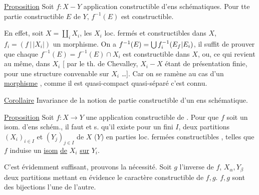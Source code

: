 \uline{Proposition} Soit $f:X-Y$  application constructible d'ens schématiques. Pour tte partie constructible $E$ de $Y$, $f^{-1}(E)$ est constructible.


En effet, soit $X=\coprod_iX_i$, les $X_i$ loc. fermés et constructibles dans $X$,  $f_i=(f\,|\,|X_i|)$ un morphisme. On a $f^{-1}(E)=\bigcup f_i^{-1}(E_f|E_i)$, il suffit de prouver que chaque $f^{-1}(E)=f^{-1}(E)\cap X_i$ est constructible dans $X$, ou, ce qui revient au même, dans $X_i$ [ par le th. de Chevalley,  $X_i-X$ étant de présentation finie, pour une structure  convenable sur $X_i$ \ldots]. Car on se ramène au cas d'un \uline{morphisme} , comme il est quasi-compact quasi-séparé c'est connu.


\uline{Corollaire} Invariance de la notion de partie constructible d'un ens schématique.

\uline{Proposition} Soit $f:X\longrightarrow Y$ une application constructible de  . Pour que $f$ soit un isom. d'ens schém., il faut et s. qu'il existe  pour un fini $I$, deux partitions $(X_i)_{i\in I}$ et $(Y_j)_{j\in I}$ de $X$ ($Y$) en parties loc. fermées constructibles , telles que $f$ induise un \uline{isom} \uline{de} $X_i$ \uline{sur} $Y_i$.

C'est évidemment suffisant, prouvons la nécessité. Soit $g$ l'inverse de $f$, $X_\alpha,Y_\beta$ deux partitions  mettant en évidence le caractère constructible de $f,g$.  $f,g$ sont des bijections  l'une de l'autre.


